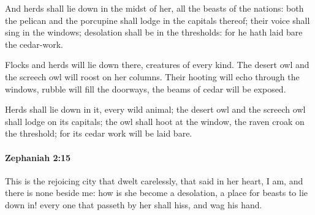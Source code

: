 			\begin{versebox}
					\item[BHS] 
					\item[LXX] 
					\item[ASV] And herds shall lie down in the midst of her, all the beasts of the nations: both the pelican and the porcupine shall lodge in the capitals thereof; their voice shall sing in the windows; desolation shall be in the thresholds: for he hath laid bare the cedar-work.
					\item[NIV] Flocks and herds will lie down there, creatures of every kind. The desert owl and the screech owl will roost on her columns. Their hooting will echo through the windows, rubble will fill the doorways, the beams of cedar will be exposed.
					\item[NRSV] Herds shall lie down in it, every wild animal; the desert owl and the screech owl shall lodge on its capitals; the owl shall hoot at the window, the raven croak on the threshold; for its cedar work will be laid bare.
			\end{versebox}

		\paragraph{Zephaniah 2:15} %
			\label{ZEPHANIAH-2-15}

			This is the rejoicing city that dwelt carelessly, that said in her heart, I am, and there is none beside me: how is she become a desolation, a place for beasts to lie down in! every one that passeth by her shall hiss, and wag his hand.

